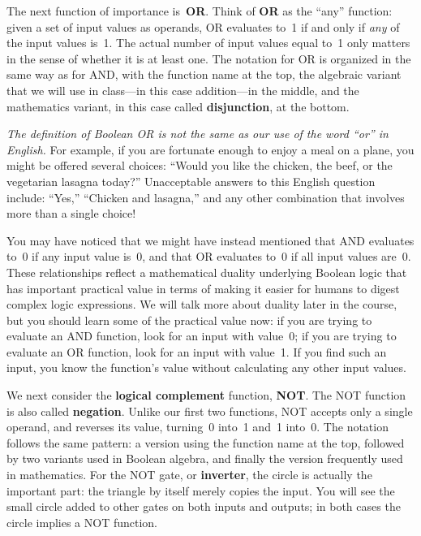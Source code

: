 The next function of importance is~{\bf OR}.  Think of {\bf OR} as the
``any'' function: given a set of input values as operands, OR evaluates
to~1 if and only if {\em any} of the input values is~1.  The actual
number of input values equal to~1 only matters in the sense of whether
it is at least one.  The notation for OR is organized in the same way
as for AND, with the function name at the top, the algebraic variant that
we will use in class---in this case addition---in the middle, and
the mathematics variant, in this case called {\bf disjunction}, at the
bottom.

{\em The definition of Boolean OR is not the same as our use of 
the word ``or'' 
in English.}  For example, if you are fortunate enough to enjoy
a meal on a plane, you might be offered several choices: ``Would you like
the chicken, the beef, or the vegetarian lasagna today?''  Unacceptable
answers to this English question include: ``Yes,'' ``Chicken and lasagna,''
and any other combination that involves more than a single choice!

You may have noticed that we might have instead mentioned that
AND evaluates to~0 if any input value is~0, and that OR evaluates to~0
if all input values are~0.  These relationships reflect a mathematical
duality underlying Boolean logic that has important practical
value in terms of making it easier for humans to digest complex logic
expressions.
We will talk more about duality later in the course, but you
should learn some of the practical
value now: if you are trying to evaluate an AND function, look for an input
with value~0; if you are trying to evaluate an OR function, look for an 
input with value~1.  If you find such an input, you know the function's
value without calculating any other input values.

We next consider the {\bf logical complement} function, {\bf NOT}.  The NOT
function is also called {\bf negation}.  Unlike our
first two functions, NOT accepts only a single operand, and reverses
its value, turning~0 into~1 and~1 into~0.  The notation follows the
same pattern: a version using the function name at the top, followed
by two variants used in Boolean algebra, and finally the version
frequently used in mathematics.  For the NOT gate, or {\bf inverter},
the circle is actually the important part: the triangle by itself
merely copies the input.  You will see the small circle added to other
gates on both inputs and outputs; in both cases the circle implies a NOT
function.

\pagebreak

